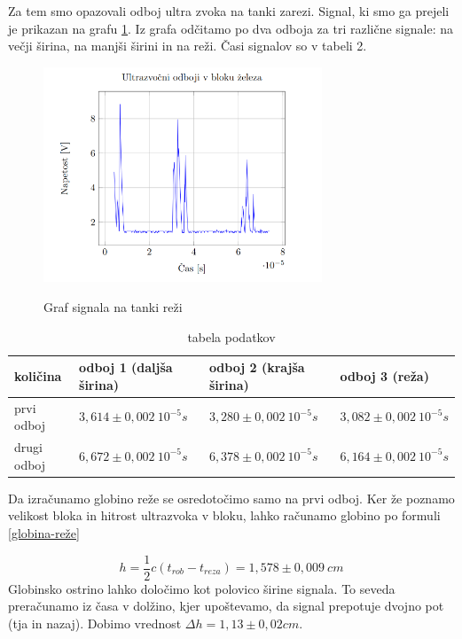 \documentclass[12pt]{article}
\begin{document}
\noindent Za tem smo opazovali odboj ultra zvoka na tanki zarezi. Signal, ki smo ga prejeli je prikazan na grafu \ref{reža}. Iz grafa odčitamo po dva odboja za tri različne signale: na večji širina, na manjši širini in na reži. Časi signalov so v tabeli 2.

\begin{figure}[ht]
\begin{center}
    \includegraphics[width=8.3cm]{reza.png}
    \label{reža}
    \caption{Graf signala na tanki reži}
\end{center}
\end{figure}

\begin{table}[h]
\begin{center}
\begin{tabular}{l|l|l|l}
količina    & odboj 1 (daljša širina)    & odboj 2 (krajša širina)    & odboj 3 (reža)             \\ \hline
prvi odboj  & $3,614\pm 0,002\ 10^{-5}s$ & $3,280\pm 0,002\ 10^{-5}s$ & $3,082\pm 0,002\ 10^{-5}s$ \\
drugi odboj & $6,672\pm 0,002\ 10^{-5}s$ & $6,378\pm 0,002\ 10^{-5}s$ & $6,164\pm 0,002\ 10^{-5}s$

\end{tabular}
\label{reža-tabela}
\caption{tabela podatkov}
\end{center}
\end{table}


\noindent Da izračunamo globino reže se osredotočimo samo na prvi odboj. Ker že poznamo velikost bloka in hitrost ultrazvoka v bloku, lahko računamo globino po formuli \ref{globina-reže}

\begin{equation}
    h = \frac{1}{2}c(t_{rob} - t_{reza}) = 1,578\pm 0,009\ cm
    \label{globina-reže}
\end{equation}
Globinsko ostrino lahko določimo kot polovico širine signala. To seveda preračunamo iz časa v dolžino, kjer upoštevamo, da signal prepotuje dvojno pot (tja in nazaj).
Dobimo vrednost $\Delta h = 1,13 \pm 0,02 cm$.
\end{document}
